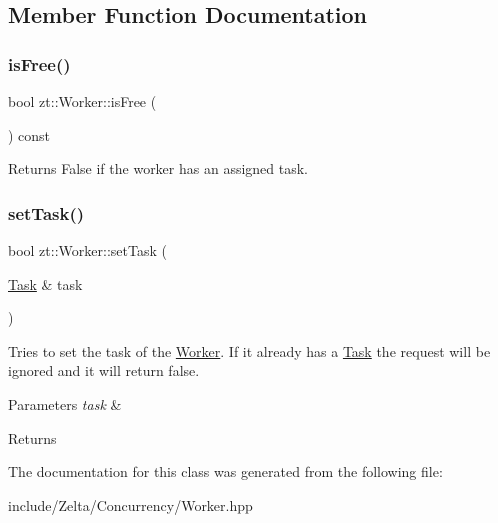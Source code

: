 \subsection{Member Function Documentation}
\mbox{\label{classzt_1_1_worker_a5f1ff7cb0e56f997c164a7e170ac3600}} 
\subsubsection{\texorpdfstring{is\+Free()}{isFree()}}
{\footnotesize\ttfamily bool zt\+::\+Worker\+::is\+Free (\begin{DoxyParamCaption}{ }\end{DoxyParamCaption}) const}

\begin{DoxyReturn}{Returns}
False if the worker has an assigned task. 
\end{DoxyReturn}
\mbox{\label{classzt_1_1_worker_a4e5938583876d5e05e3f4418ef135634}} 
\subsubsection{\texorpdfstring{set\+Task()}{setTask()}}
{\footnotesize\ttfamily bool zt\+::\+Worker\+::set\+Task (\begin{DoxyParamCaption}\item[{\hyperlink{classzt_1_1_task}{Task} \&}]{task }\end{DoxyParamCaption})}

Tries to set the task of the \hyperlink{classzt_1_1_worker}{Worker}. If it already has a \hyperlink{classzt_1_1_task}{Task} the request will be ignored and it will return false. 
\begin{DoxyParams}{Parameters}
{\em task} & \\
\hline
\end{DoxyParams}
\begin{DoxyReturn}{Returns}

\end{DoxyReturn}


The documentation for this class was generated from the following file\+:\begin{DoxyCompactItemize}
\item 
include/\+Zelta/\+Concurrency/Worker.\+hpp\end{DoxyCompactItemize}
